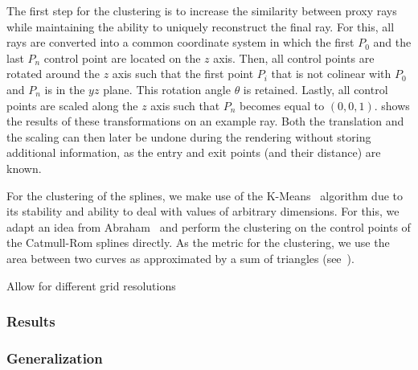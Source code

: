 The first step for the clustering is to increase the similarity between proxy rays while maintaining the ability to uniquely reconstruct the final ray. For this, all rays are converted into a common coordinate system in which the first $P_0$ and the last $P_n$ control point are located on the $z$ axis. Then, all control points are rotated around the $z$ axis such that the first point $P_i$ that is not colinear with $P_0$ and $P_n$ is in the $yz$ plane. This rotation angle $\theta$ is retained. Lastly, all control points are scaled along the $z$ axis such that $P_n$ becomes equal to $(0,0,1)$.  shows the results of these transformations on an example ray. Both the translation and the scaling can then later be undone during the rendering without storing additional information, as the entry and exit points (and their distance) are known.

For the clustering of the splines, we make use of the K-Means~\cite{hartigan75kmeans} algorithm due to its stability and ability to deal with values of arbitrary dimensions. For this, we adapt an idea from Abraham~\etal \cite{abraham03clustering} and perform the clustering on the control points of the Catmull-Rom splines directly. As the metric for the clustering, we use the area between two curves as approximated by a sum of triangles (see~).


Allow for different grid resolutions




\subsubsection{Results}
\label{contributions:medbio:fem:results}

\subsubsection{Generalization}
\label{contributions:medbio:fem:generalization}


